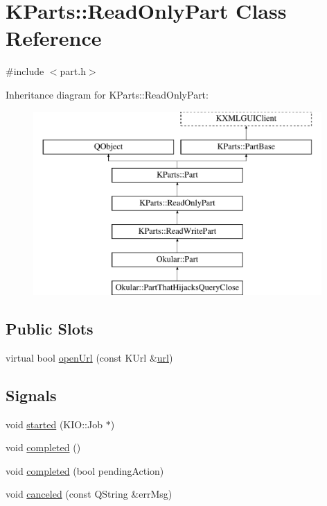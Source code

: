 \hypertarget{classKParts_1_1ReadOnlyPart}{\section{K\+Parts\+:\+:Read\+Only\+Part Class Reference}
\label{classKParts_1_1ReadOnlyPart}
}


{\ttfamily \#include $<$part.\+h$>$}

Inheritance diagram for K\+Parts\+:\+:Read\+Only\+Part\+:\begin{figure}[H]
\begin{center}
\leavevmode
\includegraphics[height=7.000000cm]{classKParts_1_1ReadOnlyPart}
\end{center}
\end{figure}
\subsection*{Public Slots}
\begin{DoxyCompactItemize}
\item 
virtual bool \hyperlink{classKParts_1_1ReadOnlyPart_a1ff41b28f8da57ccc380e0c092a50c0c}{open\+Url} (const K\+Url \&\hyperlink{classKParts_1_1ReadOnlyPart_a5b8edbf05a338814287496882adde559}{url})
\end{DoxyCompactItemize}
\subsection*{Signals}
\begin{DoxyCompactItemize}
\item 
void \hyperlink{classKParts_1_1ReadOnlyPart_a1839e6f2741b7fca77cd4b04b5acdc6d}{started} (K\+I\+O\+::\+Job $\ast$)
\item 
void \hyperlink{classKParts_1_1ReadOnlyPart_a7dbe7a0dd64ed631d7d7fc763167de31}{completed} ()
\item 
void \hyperlink{classKParts_1_1ReadOnlyPart_a48ddc679f4b303102237f8e33b29c904}{completed} (bool pending\+Action)
\item 
void \hyperlink{classKParts_1_1ReadOnlyPart_ab1083f7c30e868d66e1f326b94851d8c}{canceled} (const Q\+String \&err\+Msg)
\end{DoxyCompactItemize}
